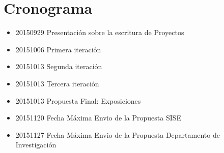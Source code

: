 \section{Cronograma}

\begin{itemize}
	\item 20150929 Presentación sobre la escritura de Proyectos
	\item 20151006 Primera iteración
	\item 20151013 Segunda iteración
	\item 20151013 Tercera iteración
	\item 20151013 Propuesta Final: Exposiciones
	\item 20151120 Fecha Máxima Envio de la Propuesta SISE
	\item 20151127 Fecha Máxima Envio de la Propuesta Departamento de Investigación
\end{itemize}

